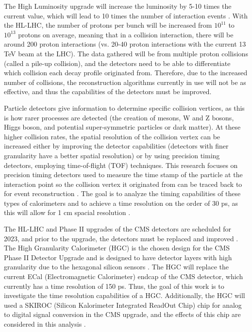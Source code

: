 \documentclass[twocolumn,aps,prd,reprint]{revtex4-1}
\begin{document}
The High Luminosity upgrade will increase the luminosity by 5-10 times the current value, which will lead to 10 times the number of interaction events \cite{Bilki}. With the HL-LHC, the number of protons per bunch will be increased from $10^{11}$ to $10^{13}$ protons on average, meaning that in a collision interaction, there will be around 200 proton interactions (vs. 20-40 proton interactions with the current 13 TeV beam at the LHC). The data gathered will be from multiple proton collisions (called a pile-up collision), and the detectors need to be able to differentiate which collision each decay profile originated from. Therefore, due to the increased number of collisions, the reconstruction algorithms currently in use will not be as effective, and thus the capabilities of the detectors must be improved.

Particle detectors give information to determine specific collision vertices, as this is how rarer processes are detected (the creation of mesons, W and Z bosons, Higgs boson, and potential super-symmetric particles or dark matter). At these higher collision rates, the spatial resolution of the collision vertex can be increased either by improving the detector capabilities (detectors with finer granularity have a better spatial resolution) or by using precision timing detectors, employing time-of-flight (TOF) techniques. This research focuses on precision timing detectors used to measure the time stamp of the particle at the interaction point so the collision vertex it originated from can be traced back to for event reconstruction \cite{Xie}. The goal is to analyze the timing capabilities of these types of calorimeters and to achieve a time resolution on the order of 30 ps, as this will allow for 1 cm spacial resolution \cite{Xie}.

The HL-LHC and Phase II upgrades of the CMS detectors are scheduled for 2023, and prior to the upgrade, the detectors must be replaced and improved \cite{Bilki}. The High Granularity Calorimeter (HGC) is the chosen design for the CMS Phase II Detector Upgrade and is designed to have detector layers with high granularity due to the hexagonal silicon sensors \cite{Bilki}. The HGC will replace the current ECal (Electromagnetic Calorimeter) endcap of the CMS detector, which currently has a time resolution of 150 ps. Thus, the goal of this work is to investigate the time resolution capabilities of a HGC. Additionally, the HGC will used a SKIROC (Silicon Kalorimeter Integrated ReadOut Chip) chip for analog to digital signal conversion in the CMS upgrade, and the effects of this chip are considered in this analysis \cite{Callier}.
\end{document}
